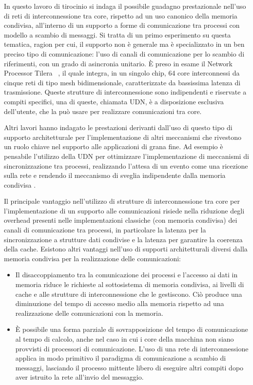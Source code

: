 In questo lavoro di tirocinio si indaga il possibile guadagno prestazionale nell'uso di reti di interconnessione tra core, rispetto ad un uso canonico della memoria condivisa, all'interno di un supporto a forme di comunicazione tra processi con modello a scambio di messaggi.
Si tratta di un primo esperimento su questa tematica, ragion per cui, il supporto non \`e generale ma \`e specializzato in un ben preciso tipo di comunicazione: l'uso di canali di comunicazione per lo scambio di riferimenti, con un grado di asincronia unitario.
\`E preso in esame il Network Processor Tilera \tile\ \cite{tileracorporation}, il quale integra, in un singolo chip, 64 core interconnessi da cinque reti di tipo mesh bidimensionale, caratterizzate da bassissima latenza di trasmissione. Queste strutture di interconnessione sono indipendenti e riservate a compiti specifici, una di queste, chiamata UDN, \`e a disposizione esclusiva dell'utente, che la pu\`o usare per realizzare comunicazioni tra core. 

Altri lavori hanno indagato le prestazioni derivanti dall'uso di questo tipo di supporto architetturale per l'implementazione di altri meccanismi che rivestono un ruolo chiave nel supporto alle applicazioni di grana fine. Ad esempio \`e pensabile l'utilizzo della UDN per ottimizzare l'implementazione di meccanismi di sincronizzazione tra processi, realizzando l'attesa di un evento come una ricezione sulla rete e rendendo il meccanismo di sveglia indipendente dalla memoria condivisa \cite{evalFineGrainSynchMech}.

Il principale vantaggio nell'utilizzo di strutture di interconnessione tra core per l'implementazione di un supporto alle comunicazioni risiede nella riduzione degli overhead presenti nelle implementazioni classiche (con memoria condivisa) dei canali di comunicazione tra processi, in particolare la latenza per la sincronizzazione a strutture dati condivise e la latenza per garantire la coerenza della cache. 
Esistono altri vantaggi nell'uso di supporti architetturali diversi dalla memoria condivisa per la realizzazione delle comunicazioni: 
\begin{itemize}
  \item Il disaccoppiamento tra la comunicazione dei processi e l'accesso ai dati in memoria riduce le richieste al sottosistema di memoria condivisa, ai livelli di cache e alle strutture di interconnessione che le gestiscono. Ci\`o produce una diminuzione del tempo di accesso medio alla memoria rispetto ad una realizzazione delle comunicazioni con la memoria.
  \item \`E possibile una forma parziale di sovrapposizione del tempo di comunicazione al tempo di calcolo, anche nel caso in cui i core della macchina non siano provvisti di processori di comunicazione. L'uso di una rete di interconnessione applica in modo primitivo il paradigma di comunicazione a scambio di messaggi, lasciando il processo mittente libero di eseguire altri compiti dopo aver istruito la rete all'invio del messaggio.
\end{itemize}

